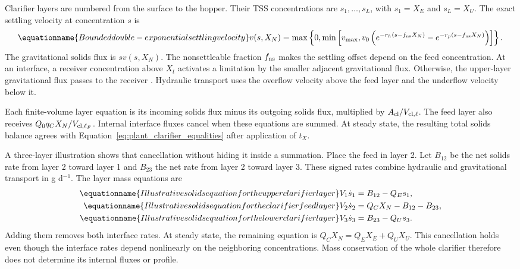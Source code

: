 Clarifier layers are numbered from the surface to the hopper. Their TSS concentrations are $s_1,\ldots,s_L$, with $s_1=X_E$ and $s_L=X_U$. The exact settling velocity at concentration $s$ is
\begin{equation}
\equationname{Bounded double-exponential settling velocity}
v(s,X_N)=\max\left\{0,\min\left[v_{\max},
v_0\left(e^{-r_h(s-f_{\rm ns}X_N)}-e^{-r_p(s-f_{\rm ns}X_N)}\right)\right]\right\}.
\label{eq:plant_settling_velocity}
\end{equation}
The gravitational solids flux is $sv(s,X_N)$. The nonsettleable fraction $f_{\rm ns}$ makes the settling offset depend on the feed concentration. At an interface, a receiver concentration above $X_t$ activates a limitation by the smaller adjacent gravitational flux. Otherwise, the upper-layer gravitational flux passes to the receiver \citep{Takacs1991}. Hydraulic transport uses the overflow velocity above the feed layer and the underflow velocity below it.

Each finite-volume layer equation is its incoming solids flux minus its outgoing solids flux, multiplied by $A_{\rm cl}/V_{{\rm cl},\ell}$. The feed layer also receives $Q_0q_CX_N/V_{{\rm cl},\ell_F}$. Internal interface fluxes cancel when these equations are summed. At steady state, the resulting total solids balance agrees with Equation~\eqref{eq:plant_clarifier_equalities} after application of $t_X$.

A three-layer illustration shows that cancellation without hiding it inside a summation. Place the feed in layer 2. Let $B_{12}$ be the net solids rate from layer 2 toward layer 1 and $B_{23}$ the net rate from layer 2 toward layer 3. These signed rates combine hydraulic and gravitational transport in g d$^{-1}$. The layer mass equations are
\begin{align}
\equationname{Illustrative solids equation for the upper clarifier layer}
V_1\dot s_1&=B_{12}-Q_Es_1,\\
\equationname{Illustrative solids equation for the clarifier feed layer}
V_2\dot s_2&=Q_CX_N-B_{12}-B_{23},\\
\equationname{Illustrative solids equation for the lower clarifier layer}
V_3\dot s_3&=B_{23}-Q_Us_3.
\end{align}
Adding them removes both interface rates. At steady state, the remaining equation is $Q_CX_N=Q_EX_E+Q_UX_U$. This cancellation holds even though the interface rates depend nonlinearly on the neighboring concentrations. Mass conservation of the whole clarifier therefore does not determine its internal fluxes or profile.

